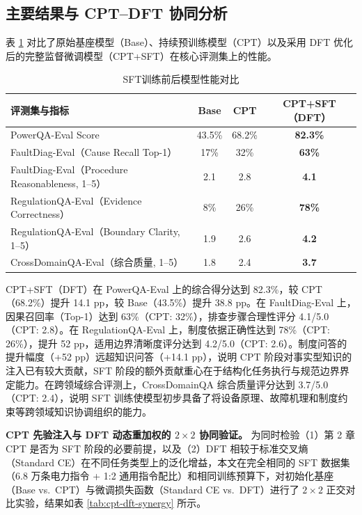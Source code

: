 \documentclass[fontset=fandol,type=master,campus=shenzhen,etitleauto=true]{hithesisbook}
\begin{document}
\subsection{主要结果与 CPT--DFT 协同分析}\label{ux4e3bux8981ux7ed3ux679c-2}

表 \ref{tab:sft-results} 对比了原始基座模型（Base）、持续预训练模型（CPT）以及采用 DFT 优化后的完整监督微调模型（CPT+SFT）在核心评测集上的性能。

\begin{table}[htbp]
\centering
\caption{SFT训练前后模型性能对比}
\label{tab:sft-results}
\small
\begin{tabular}{l c c c}
\toprule
\textbf{评测集与指标} & \textbf{Base} & \textbf{CPT} & \textbf{CPT+SFT（DFT）} \\
\midrule
PowerQA-Eval Score & 43.5\% & 68.2\% & \textbf{82.3\%} \\
FaultDiag-Eval（Cause Recall Top-1） & 17\% & 32\% & \textbf{63\%} \\
FaultDiag-Eval（Procedure Reasonableness, 1--5） & 2.1 & 2.8 & \textbf{4.1} \\
RegulationQA-Eval（Evidence Correctness） & 8\% & 26\% & \textbf{78\%} \\
RegulationQA-Eval（Boundary Clarity, 1--5） & 1.9 & 2.6 & \textbf{4.2} \\
CrossDomainQA-Eval（综合质量, 1--5） & 1.8 & 2.4 & \textbf{3.7} \\
\bottomrule
\end{tabular}
\end{table}

CPT+SFT（DFT）在 PowerQA-Eval 上的综合得分达到 82.3\%，较 CPT（68.2\%）提升 14.1 pp，较 Base（43.5\%）提升 38.8 pp。在 FaultDiag-Eval 上，因果召回率（Top-1）达到 63\%（CPT: 32\%），排查步骤合理性评分 4.1/5.0（CPT: 2.8）。在 RegulationQA-Eval 上，制度依据正确性达到 78\%（CPT: 26\%），提升 52 pp，适用边界清晰度评分达到 4.2/5.0（CPT: 2.6）。制度问答的提升幅度（+52 pp）远超知识问答（+14.1 pp），说明 CPT 阶段对事实型知识的注入已有较大贡献，SFT 阶段的额外贡献重心在于结构化任务执行与规范边界界定能力。在跨领域综合评测上，CrossDomainQA 综合质量评分达到 3.7/5.0（CPT: 2.4），说明 SFT 训练使模型初步具备了将设备原理、故障机理和制度约束等跨领域知识协调组织的能力。

\textbf{CPT 先验注入与 DFT 动态重加权的 $2 \times 2$ 协同验证。} 为同时检验（1）第 2 章 CPT 是否为 SFT 阶段的必要前提，以及（2）DFT 相较于标准交叉熵（Standard CE）在不同任务类型上的泛化增益，本文在完全相同的 SFT 数据集（6.8 万条电力指令 + 1:2 通用指令配比）和相同训练预算下，对初始化基座（Base vs.\ CPT）与微调损失函数（Standard CE vs.\ DFT）进行了 $2 \times 2$ 正交对比实验，结果如表 \ref{tab:cpt-dft-synergy} 所示。
\end{document}

